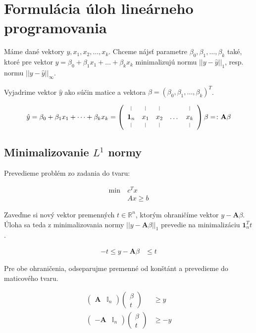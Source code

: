 \documentclass[report.tex]{subfiles}
\begin{document}
\section{Formulácia úloh lineárneho programovania}\label{sec:A}

Máme dané vektory $y, x_1, x_2, \dots, x_k$. Chceme nájsť parametre $\beta_0, \beta_1,\dots,\beta_k$ také, ktoré pre vektor $\hat{y} = \beta_0 + \beta_1x_1 + \dots + \beta_kx_k$ minimalizujú normu $||y - \hat{y}||_1$, resp. normu $||y - \hat{y}||_{\infty}$. 

Vyjadrime vektor $\hat{y}$ ako súčin matice a vektora $\beta = (\beta_0, \beta_1, \dots, \beta_k)^T$.

\begin{align*}
	\hat{y} = \beta_0 + \beta_1x_1 + \dots + \beta_kx_k = 
	\left(
		\begin{array}{ccccc}
			\vertbar & \vertbar & \vertbar &  & \vertbar \\
			\mathbf{1}_n & x_1 & x_2 & \dots & x_k \\
			\vertbar & \vertbar & \vertbar &  & \vertbar
		\end{array}
	\right)
	\beta
	=\colon
	\mathbf{A} \beta
\end{align*}

\subsection{Minimalizovanie $L^1$ normy}

Prevedieme problém zo zadania do tvaru:

\begin{align*}
	\text{min}~ &c^Tx\\
	&Ax \geq b
\end{align*}

Zaveďme si nový vektor premenných $t \in \mathbb{R}^n$, ktorým ohraničíme vektor $y - \mathbf{A} \beta$. Úloha sa teda z minimalizovania normy $||y - \mathbf{A} \beta||_1$ prevedie na minimalizáciu $\mathbf{1}_n^Tt$.

\begin{align*}
	-t \leq y - \mathbf{A} \beta &\leq t
\end{align*}	

Pre obe ohraničenia, odseparujme premenné od konštánt a prevedieme do maticového tvaru.

\begin{align*}
	\left(
		\begin{array}{c|c}
			\mathbf{A} & \mathbb{I}_n
		\end{array}
	\right)
	\left(
		\begin{array}{c}
			\beta \\
			\hline
			t
		\end{array}
	\right) &\geq y \\
	\left(
		\begin{array}{c|c}
			-\mathbf{A} & \mathbb{I}_n
		\end{array}
	\right)
	\left(
		\begin{array}{c}
			\beta \\
			\hline
			t
		\end{array}
	\right) &\geq -y
\end{align*}
\end{document}
